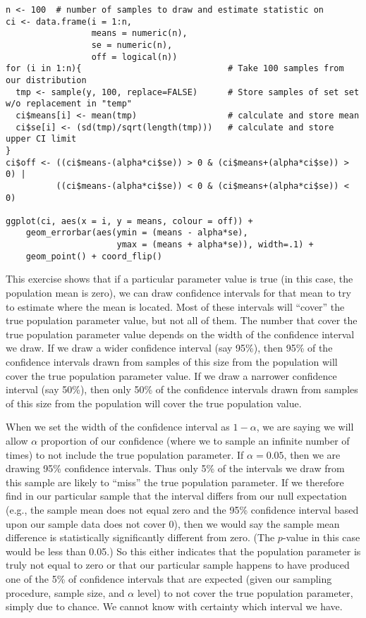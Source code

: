 \documentclass[a4paper,12pt]{article}
\begin{document}
\begin{enumerate*}
\begin{verbatim}
n <- 100  # number of samples to draw and estimate statistic on
ci <- data.frame(i = 1:n,
                 means = numeric(n),
                 se = numeric(n),
                 off = logical(n))
for (i in 1:n){                             # Take 100 samples from our distribution
  tmp <- sample(y, 100, replace=FALSE)      # Store samples of set set w/o replacement in "temp"
  ci$means[i] <- mean(tmp)                  # calculate and store mean
  ci$se[i] <- (sd(tmp)/sqrt(length(tmp)))   # calculate and store upper CI limit
}
ci$off <- ((ci$means-(alpha*ci$se)) > 0 & (ci$means+(alpha*ci$se)) > 0) | 
          ((ci$means-(alpha*ci$se)) < 0 & (ci$means+(alpha*ci$se)) < 0)

ggplot(ci, aes(x = i, y = means, colour = off)) + 
    geom_errorbar(aes(ymin = (means - alpha*se), 
                      ymax = (means + alpha*se)), width=.1) + 
    geom_point() + coord_flip()
\end{verbatim}

This exercise shows that if a particular parameter value is true (in this case, the population mean is zero), we can draw confidence intervals for that mean to try to estimate where the mean is located. Most of these intervals will ``cover'' the true population parameter value, but not all of them. The number that cover the true population parameter value depends on the width of the confidence interval we draw. If we draw a wider confidence interval (say 95\%), then 95\% of the confidence intervals drawn from samples of this size from the population will cover the true population parameter value. If we draw a narrower confidence interval (say 50\%), then only 50\% of the confidence intervals drawn from samples of this size from the population will cover the true population value. 

When we set the width of the confidence interval as $1-\alpha$, we are saying we will allow $\alpha$ proportion of our confidence (where we to sample an infinite number of times) to not include the true population parameter. If $\alpha = 0.05$, then we are drawing 95\% confidence intervals. Thus only 5\% of the intervals we draw from this sample are likely to ``miss'' the true population parameter. If we therefore find in our particular sample that the interval differs from our null expectation (e.g., the sample mean does not equal zero and the 95\% confidence interval based upon our sample data does not cover 0), then we would say the sample mean difference is statistically significantly different from zero. (The $p$-value in this case would be less than 0.05.) So this either indicates that the population parameter is truly not equal to zero or that our particular sample happens to have produced one of the 5\% of confidence intervals that are expected (given our sampling procedure, sample size, and $\alpha$ level) to not cover the true population parameter, simply due to chance. We cannot know with certainty which interval we have.


\end{enumerate*}
\end{document}
